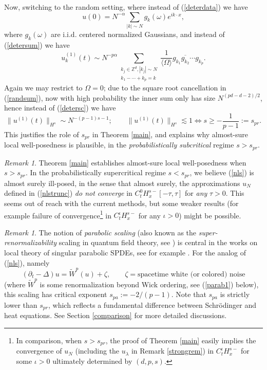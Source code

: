 \documentclass[11 pt,reqno]{amsart}
\theoremstyle{definition}
\theoremstyle{remark}
\newtheorem{rem}[thm]{Remark}
\numberwithin{equation}{section}
\newcommand{\Zb}{\mathbb{Z}}
\begin{document}
 Now, switching to the random setting, where instead of (\ref{deterdata}) we have
  \begin{equation}\label{randata}u(0)=N^{-\alpha}\sum_{|k|\sim N}g_k(\omega)e^{ik\cdot x},
   \end{equation} where $g_k(\omega)$ are i.i.d. centered normalized Gaussians, and instead of (\ref{detersum}) we have
  \begin{equation}\label{randsum}u_k^{(1)}(t)\sim N^{-p\alpha}\sum_{\substack{k_j\in\Zb^d,|k_j|\sim N\\k_1-\cdots+k_p=k}}\frac{1}{\langle\Omega\rangle}g_{k_1}\overline{g_{k_2}}\cdots g_{k_p}.
 \end{equation} Again we may restrict to $\Omega=0$; due to the square root cancellation in (\ref{randsum}), now with high probability the inner sum only has size $N^{(pd-d-2)/2}$, hence instead of (\ref{detersc}) we have
 \begin{equation}\label{randsc}\|u^{(1)}(t)\|_{H^s}\sim N^{-(p-1)s-1};\qquad \|u^{(1)}(t)\|_{H^s}\lesssim1\Leftrightarrow s\geq -\frac{1}{p-1}:=s_{pr}.
 \end{equation} This justifies the role of $s_{pr}$ in Theorem \ref{main}, and explains why almost-sure local well-posedness is plausible, in the \emph{probabilistically subcritical} regime $s>s_{pr}$.
 \begin{rem} Theorem \ref{main} establishes almost-sure local well-posedness when $s>s_{pr}$. In the probabilistically supercritical regime $s<s_{pr}$, we believe (\ref{nls}) is almost surely ill-posed, in the sense that almost surely, the approximations $u_N$ defined in (\ref{nlstrunc}) \emph{do not converge} in $C_t^0H_x^{s-}[-\tau,\tau]$ for \emph{any} $\tau>0$. This seems out of reach with the current methods, but some weaker results (for example failure of convergence\footnote{In comparison, when $s>s_{pr}$, the proof of Theorem \ref{main} easily implies the convergence of $u_N$ (including the $u_\lambda$ in Remark \ref{strongrem}) in $C_t^\iota H_x^{s-}$ for some $\iota>0$ ultimately determined by $(d,p,s)$.} in $C_t^\iota H_x^{s-}$ for any $\iota>0$) might be possible.
 \end{rem}
\begin{rem}\label{remscale} The notion of \emph{parabolic scaling} (also known as the \emph{super-renormalizability} scaling in quantum field theory, see \cite{CMW}) is central in the works on local theory of singular parabolic SPDEs, see for example \cite{Hairer,GIP}. For the analog of (\ref{nls}), namely 
 \begin{equation}\label{parab}(\partial_t-\Delta)u=\widetilde{W}^p(u)+\zeta,\qquad \zeta=\textrm{spacetime white (or colored) noise}
 \end{equation} (where $\widetilde{W}^p$ is some renormalization beyond Wick ordering, see (\ref{parab1}) below), this scaling has critical exponent $s_{pa}:=-2/(p-1)$. Note that $s_{pa}$ is strictly lower than $s_{pr}$, which reflects a fundamental difference between Schr\"{o}dinger and heat equations. See Section \ref{comparison} for more detailed discussions.
 \end{rem}
\end{document}
